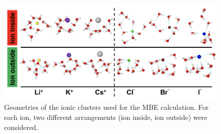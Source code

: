\begin{figure}[h]
\uwsinglespace
\centering
\includegraphics[width=\textwidth]{Figures/Chapter_3/figure_1.pdf}
\caption[Geometries of the ionic clusters used for the MBE calculation. For each ion, two different arrangements (ion inside, ion outside) were considered.]{Geometries of the ionic clusters used for the MBE calculation. For each ion, two different arrangements (ion inside, ion outside) were considered.}
\label{fig:MBE_II_1}
\end{figure}